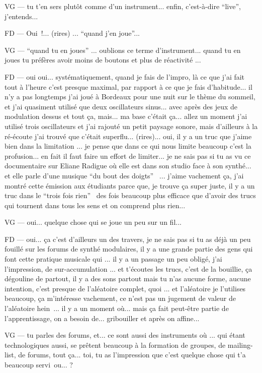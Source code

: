 VG — tu t'en sers plutôt comme d'un instrument... enfin, c'est-à-dire ``live'', j'entends...  

FD — Oui !... (rires) ... ``quand j'en joue''... 

VG — ``quand tu en joues'' ... oublions ce terme d'instrument... quand tu en joues tu préfères avoir moins de boutons et plus de réactivité ... 

FD — oui oui... systématiquement, quand je fais de l'impro, là ce que j'ai fait tout à l'heure c'est presque maximal, par rapport à ce que je fais d'habitude... il n'y a pas longtemps j'ai joué à Bordeaux pour une nuit sur le thème du sommeil, et j'ai quasiment utilisé que deux oscillateurs sinus... avec après des jeux de modulation dessus et tout ça, mais... ma base c'était ça... allez un moment j'ai utilisé trois oscillateurs et j'ai rajouté un petit paysage sonore, mais d'ailleurs à la ré-écoute j'ai trouvé que c'était superflu... (rires)... oui, il y a un truc que j'aime bien dans la limitation ... je pense que dans ce qui nous limite beaucoup c'est la profusion... en fait il faut faire un effort de limiter... je ne sais pas si tu as vu ce documentaire sur Eliane Radigue où elle est dans son studio face à son synthé... et elle parle d'une musique ``du bout des doigts''  ... j'aime vachement ça, j'ai montré cette émission aux étudiants parce que,  je trouve ça super juste, il y a un truc dans le ``trois fois rien''  des fois beaucoup plus efficace que d'avoir des trucs qui tournent dans tous les sens et on comprend plus rien... 

VG — oui... quelque chose qui se joue un peu sur un fil... 

FD — oui... ça c'est d'ailleurs un des travers, je ne sais pas si tu as déjà un peu fouillé sur les forums de synthé modulaires, il y a une grande partie des gens qui font cette pratique musicale qui ... il y a un passage un peu obligé, j'ai l'impression, de sur-accumulation ... et t'écoutes les trucs, c'est de la bouillie, ça dégouline de partout, il y a des sons partout mais tu n'as aucune forme, aucune intention, c'est presque de l'aléatoire complet, quoi ... et l'aléatoire je l'utilises beaucoup, ça m'intéresse vachement, ce n'est pas un jugement de valeur de l'aléatoire hein ... il y a un moment où... mais ça fait peut-être partie de l'apprentissage, on a besoin de... gribouiller et après on affine... 

VG — tu parles des forums, et... ce sont aussi des instruments où ... qui étant technologiques aussi, se prêtent beaucoup à la formation de groupes, de mailing-list, de forums, tout ça... toi, tu as l'impression que c'est quelque chose qui t'a beaucoup servi ou... ? 

